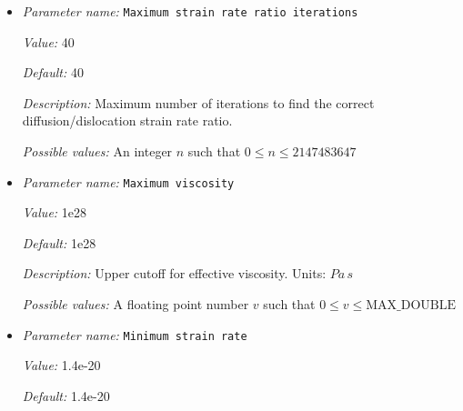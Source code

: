 \begin{itemize}
{\it Value:} 1.25e3


{\it Default:} 1.25e3


{\it Description:} The value of the specific heat $C_p$. Units: $J/kg/K$


{\it Possible values:} A floating point number $v$ such that $0 \leq v \leq \text{MAX\_DOUBLE}$
\item {\it Parameter name:} {\tt Maximum strain rate ratio iterations}
\label{parameters:Material model/Diffusion dislocation/Maximum strain rate ratio iterations}
\label{parameters:Material_20model/Diffusion_20dislocation/Maximum_20strain_20rate_20ratio_20iterations}


{\it Value:} 40


{\it Default:} 40


{\it Description:} Maximum number of iterations to find the correct diffusion/dislocation strain rate ratio.


{\it Possible values:} An integer $n$ such that $0\leq n \leq 2147483647$
\item {\it Parameter name:} {\tt Maximum viscosity}
\label{parameters:Material model/Diffusion dislocation/Maximum viscosity}
\label{parameters:Material_20model/Diffusion_20dislocation/Maximum_20viscosity}


{\it Value:} 1e28


{\it Default:} 1e28


{\it Description:} Upper cutoff for effective viscosity. Units: $Pa \, s$


{\it Possible values:} A floating point number $v$ such that $0 \leq v \leq \text{MAX\_DOUBLE}$
\item {\it Parameter name:} {\tt Minimum strain rate}
\label{parameters:Material model/Diffusion dislocation/Minimum strain rate}
\label{parameters:Material_20model/Diffusion_20dislocation/Minimum_20strain_20rate}


{\it Value:} 1.4e-20


{\it Default:} 1.4e-20



\end{itemize}
